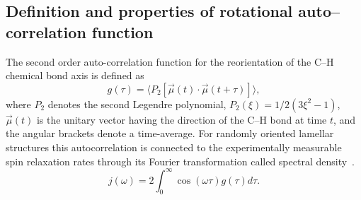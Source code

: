 \documentclass[aps,prl,superscriptaddress,twocolumn]{revtex4}
\begin{document}

\subsection{Definition and properties of rotational auto--correlation function}
The second order auto-correlation function for the reorientation of the C--H chemical bond axis is defined as
\begin{equation}\label{gt}
g(\tau) = \langle P_2[\vec{\mu}(t)\cdot\vec{\mu}(t+\tau)]\rangle,
\end{equation} 
where $P_2$ denotes the second Legendre polynomial, $P_2(\xi) = 1/2 (3\xi^2 - 1)$, $\vec{\mu}(t)$ is the unitary vector having the 
direction of the C--H bond at time $t$, and the angular brackets denote a time-average. 
For randomly oriented lamellar structures this autocorrelation is connected to the experimentally 
measurable spin relaxation rates through its Fourier transformation called spectral density~\cite{Lipari82}.
\begin{equation}\label{FT}
j(\omega) =  2\int_0^{\infty} \cos(\omega \tau) g(\tau) d\tau.
\end{equation}
\end{document}
